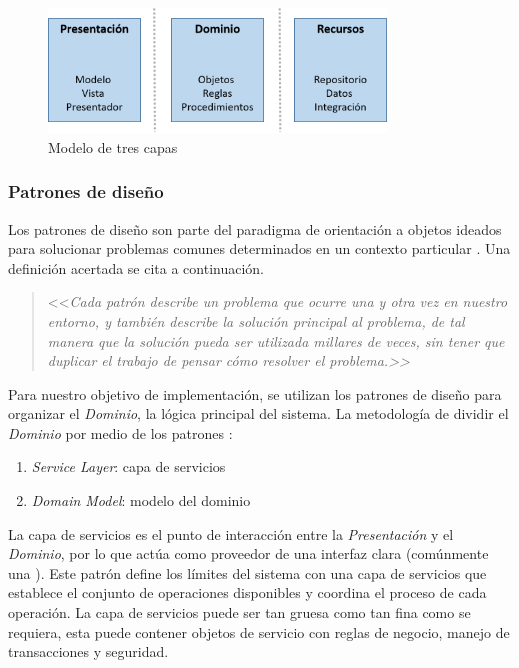 \begin{figure}[h]
\begin{centering}
\includegraphics[width=0.8\textwidth]{capitulo-5/graphics/arqui_tres_capas}
\par\end{centering}
\caption[Modelo de tres capas]{\label{fig5:tres_capas}Modelo de tres capas}

\end{figure}


\subsubsection{Patrones de diseño}

Los patrones de diseño son parte del paradigma de orientación a objetos
ideados para solucionar problemas comunes determinados en un contexto
particular \cite{Shalloway2004}. Una definición acertada se cita
a continuación.
\begin{quotation}
<<\emph{Cada patrón describe un problema que ocurre una y otra vez
en nuestro entorno, y también describe la solución principal al problema,
de tal manera que la solución pueda ser utilizada millares de veces,
sin tener que duplicar el trabajo de pensar cómo resolver el problema.>>}
\cite{Alexander1977}
\end{quotation}
Para nuestro objetivo de implementación, se utilizan los patrones
de diseño para organizar el \emph{Dominio}, la lógica principal del
sistema. La metodología de dividir el\emph{ Dominio} por medio de
los patrones \cite{Fowler2002}:
\begin{enumerate}
\item \emph{Service Layer}: capa de servicios
\item \emph{Domain Model}: modelo del dominio
\end{enumerate}
La capa de servicios es el punto de interacción entre la \emph{Presentación}
y el\emph{ Dominio}, por lo que actúa como proveedor de una interfaz
clara (comúnmente una ). Este patrón define los límites
del sistema con una capa de servicios que establece el conjunto de
operaciones disponibles y coordina el proceso de cada operación. La
capa de servicios puede ser tan gruesa como tan fina como se requiera,
esta puede contener objetos de servicio con reglas de negocio, manejo
de transacciones y seguridad.

